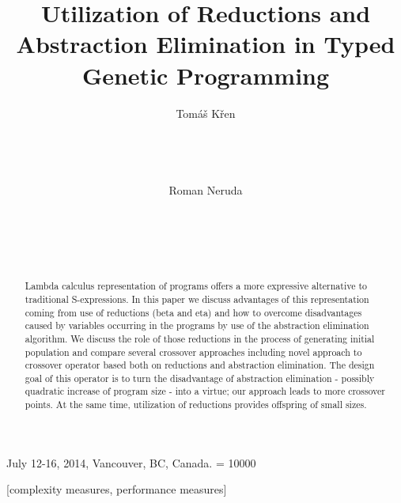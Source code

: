 \documentclass{sig-alternate}
\begin{document}
 {July 12-16, 2014, Vancouver, BC, Canada.}
\widowpenalty = 10000

\title{Utilization of Reductions and Abstraction Elimination in Typed Genetic Programming}


\author{
\alignauthor
Tom\'{a}\v{s} K\v{r}en\\
  \\
  \\
  \\
  \\
\alignauthor
Roman Neruda\\
  \\
  \\
  \\
  \\
}


\maketitle
\begin{abstract}
Lambda calculus representation of programs offers a more expressive alternative to traditional S-expressions. In this paper we discuss advantages of this representation coming from use of reductions (beta and eta) and how to overcome disadvantages caused by variables occurring in the programs by use of the abstraction elimination algorithm. We discuss the role of those reductions in the process of generating initial population and compare several crossover approaches including novel approach to crossover operator based both on reductions and abstraction elimination. The design goal of this operator is to turn the disadvantage of abstraction elimination  - possibly quadratic increase of program size - into a virtue; our approach leads to more crossover points. At the same time, utilization of reductions provides offspring of small sizes.
\end{abstract}

[complexity measures, performance measures]
\end{document}
